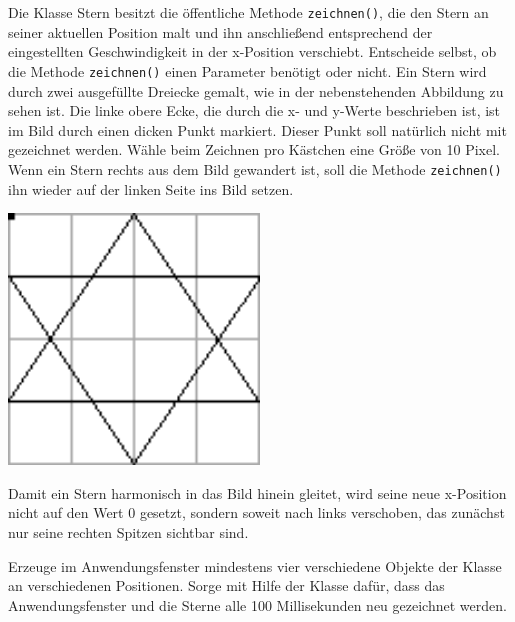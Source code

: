 \begin{compactenum}[a)]
\begin{minipage}{0.85\textwidth}
Die Klasse Stern besitzt die öffentliche Methode \lstinline|zeichnen()|, die den
Stern an seiner aktuellen Position malt und ihn anschließend entsprechend der
eingestellten Geschwindigkeit in der x-Position verschiebt. Entscheide selbst, ob
die Methode \lstinline|zeichnen()| einen Parameter benötigt oder nicht. Ein
Stern wird durch zwei ausgefüllte Dreiecke gemalt, wie in der nebenstehenden
Abbildung zu sehen ist. Die linke obere Ecke, die durch die x- und y-Werte
beschrieben ist, ist im Bild durch einen dicken Punkt markiert. Dieser Punkt
soll natürlich nicht mit gezeichnet werden. Wähle beim Zeichnen pro Kästchen
eine Größe von 10 Pixel. Wenn ein Stern rechts aus dem Bild gewandert ist, soll
die Methode \lstinline|zeichnen()| ihn wieder auf der linken Seite ins Bild
setzen.
\end{minipage}
\begin{minipage}{0.15\textwidth}
\begin{center}
\includegraphics[width=0.5\textwidth]{./inf/SEKII/10_Java_Klassen/stern.png}
\end{center}
\end{minipage}

\vspace{1mm}

Damit ein Stern harmonisch in das Bild hinein gleitet, wird seine neue
x-Position nicht auf den Wert 0 gesetzt, sondern soweit nach links verschoben,
das zunächst nur seine rechten Spitzen sichtbar sind.

\item Erzeuge im Anwendungsfenster mindestens vier verschiedene Objekte der
Klasse  an verschiedenen Positionen. Sorge mit Hilfe der Klasse
 dafür, dass das Anwendungsfenster und die Sterne alle 100
Millisekunden neu gezeichnet werden.


\end{compactenum}
